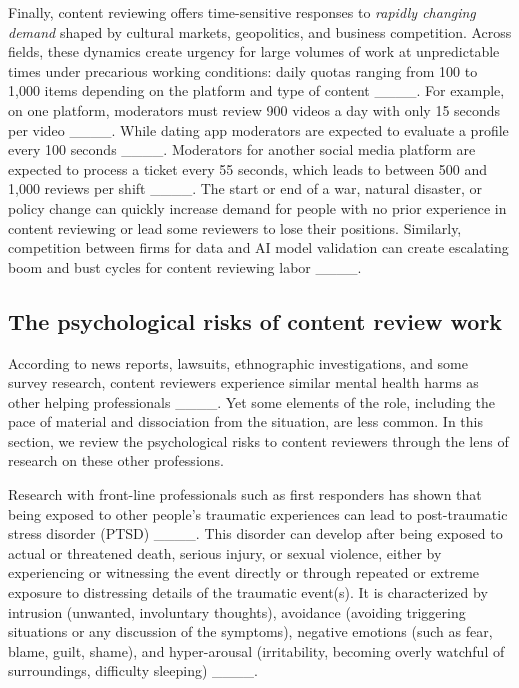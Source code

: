Finally, content reviewing offers time-sensitive responses to \textit{rapidly changing demand} shaped by cultural markets, geopolitics, and business competition. Across fields, these dynamics create urgency for large volumes of work at unpredictable times under precarious working conditions: daily quotas ranging from 100 to 1,000 items depending on the platform and type of content ____. For example, on one platform, moderators must review 900 videos a day with only 15 seconds per video ____. While dating app moderators are expected to evaluate a profile every 100 seconds ____. Moderators for another social media platform are expected to process a ticket every 55 seconds, which leads to between 500 and 1,000 reviews per shift ____. The start or end of a war, natural disaster, or policy change can quickly increase demand for people with no prior experience in content reviewing or lead some reviewers to lose their positions. Similarly, competition between firms for data and AI model validation can create escalating boom and bust cycles for content reviewing labor ____.

\subsection{The psychological risks of content review work}
According to news reports, lawsuits, ethnographic investigations, and some survey research, content reviewers experience similar mental health harms as other helping professionals ____. Yet some elements of the role, including the pace of material and dissociation from the situation, are less common. In this section, we review the psychological risks to content reviewers through the lens of research on these other professions.

Research with front-line professionals such as first responders has shown that being exposed to other people's traumatic experiences can lead to post-traumatic stress disorder (PTSD) ____. This disorder can develop after being exposed to actual or threatened death, serious injury, or sexual violence, either by experiencing or witnessing the event directly or through repeated or extreme exposure to distressing details of the traumatic event(s). It is characterized by intrusion (unwanted, involuntary thoughts), avoidance (avoiding triggering situations or any discussion of the symptoms), negative emotions (such as fear, blame, guilt, shame), and hyper-arousal (irritability, becoming overly watchful of surroundings, difficulty sleeping) ____.

